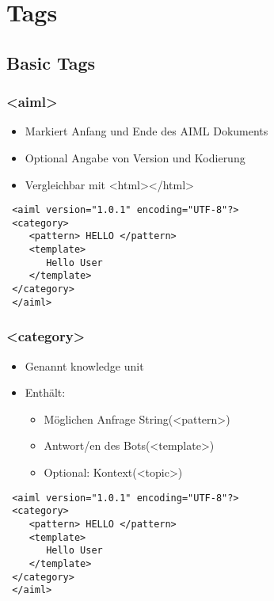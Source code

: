 \documentclass[9pt]{beamer}
\begin{document}
\section{Tags} 
\subsection{Basic Tags}
\begin{frame}[fragile]
  \frametitle{\textless aiml\textgreater}
\begin{itemize}
  \item Markiert Anfang und Ende des AIML Dokuments\\
  \item Optional Angabe von Version und Kodierung\\
  \item Vergleichbar mit \textless html\textgreater\textless /html\textgreater\\
\end{itemize}
  \begin{lstlisting}
 <aiml version="1.0.1" encoding="UTF-8"?> 
 <category> 
    <pattern> HELLO </pattern> 
    <template>  
       Hello User
    </template> 
 </category> 
 </aiml> 
  \end{lstlisting}
\end{frame}

\begin{frame}[fragile]
  \frametitle{\textless category\textgreater}  %
\begin{itemize}
  \item Genannt knowledge unit\\
  \item Enthält:\ \
\begin{itemize}
    \item Möglichen Anfrage String(\textless pattern\textgreater)\\
    \item Antwort/en des Bots(\textless template\textgreater)\\
    \item Optional: Kontext(\textless topic\textgreater)\\
  \end{itemize}
  \end{itemize}
  \begin{lstlisting}
 <aiml version="1.0.1" encoding="UTF-8"?> 
 <category> 
    <pattern> HELLO </pattern> 
    <template> 
       Hello User 
    </template> 
 </category> 
 </aiml> 
  \end{lstlisting}
\end{frame}
\end{document}
